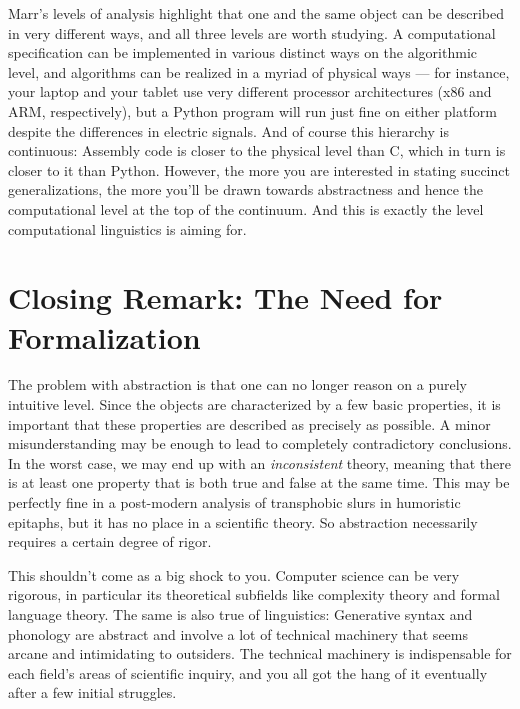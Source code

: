 %
Marr's levels of analysis highlight that one and the same object can be described in very different ways, and all three levels are worth studying.
A computational specification can be implemented in various distinct ways on the algorithmic level, and algorithms can be realized in a myriad of physical ways --- for instance, your laptop and your tablet use very different processor architectures (x86 and ARM, respectively), but a Python program will run just fine on either platform despite the differences in electric signals.
And of course this hierarchy is continuous: Assembly code is closer to the physical level than C, which in turn is closer to it than Python.
However, the more you are interested in stating succinct generalizations, the more you'll be drawn towards abstractness and hence the computational level at the top of the continuum.
And this is exactly the level computational linguistics is aiming for.

\section{Closing Remark: The Need for Formalization}

The problem with abstraction is that one can no longer reason on a purely intuitive level.
Since the objects are characterized by a few basic properties, it is important that these properties are described as precisely as possible.
A minor misunderstanding may be enough to lead to completely contradictory conclusions.
In the worst case, we may end up with an \emph{inconsistent} theory, meaning that there is at least one property that is both true and false at the same time.
This may be perfectly fine in a post-modern analysis of transphobic slurs in humoristic epitaphs, but it has no place in a scientific theory.
So abstraction necessarily requires a certain degree of rigor.

This shouldn't come as a big shock to you.
Computer science can be very rigorous, in particular its theoretical subfields like complexity theory and formal language theory.
The same is also true of linguistics:
Generative syntax and phonology are abstract and involve a lot of technical machinery that seems arcane and intimidating to outsiders.
The technical machinery is indispensable for each field's areas of scientific inquiry, and you all got the hang of it eventually after a few initial struggles.

